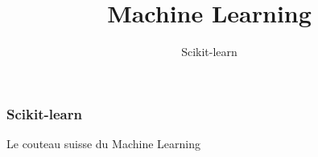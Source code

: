 \documentclass{formation}
\title{Machine Learning}
\subtitle{Scikit-learn}
\begin{document}
\maketitle

\begin{frame}
  \frametitle{Scikit-learn}
  Le couteau suisse du Machine Learning
\end{frame}
\end{document}
